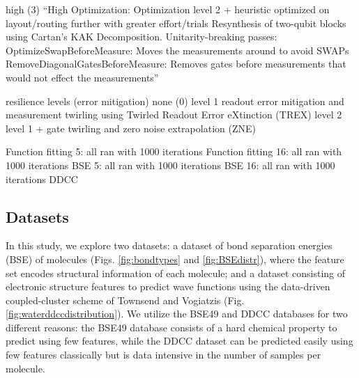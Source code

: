 \documentclass[journal=jacsat,manuscript=article]{achemso}
\begin{document}
high (3)
``High Optimization:
Optimization level 2 + heuristic optimized on layout/routing further with greater effort/trials
Resynthesis of two-qubit blocks using Cartan's KAK Decomposition.
Unitarity-breaking passes:
OptimizeSwapBeforeMeasure: Moves the measurements around to avoid SWAPs
RemoveDiagonalGatesBeforeMeasure: Removes gates before measurements that would not effect the measurements''


resilience levels (error mitigation)
none (0) 
level 1 readout error mitigation and measurement twirling using Twirled Readout Error eXtinction (TREX) \cite{van_den_berg_model-free_2022}
level 2 level 1 + gate twirling and zero noise extrapolation (ZNE)\cite{kandala_error_2019,li_efficient_2017,temme_error_2017}

Function fitting 5: all ran with 1000 iterations
Function fitting 16: all ran with 1000 iterations
BSE 5: all ran with 1000 iterations
BSE 16: all ran with 1000 iterations
DDCC

\subsection{Datasets}\label{subsection:datasets}
In this study, we explore two datasets: a dataset of bond separation energies (BSE) of molecules (Figs. \ref{fig:bondtypes} and \ref{fig:BSEdistr}), where the feature set encodes structural information of each molecule;
and a dataset consisting of electronic structure features to predict wave functions using the data-driven coupled-cluster scheme of Townsend and Vogiatzis (Fig. \ref{fig:waterddccdistribution}).\cite{townsend_data-driven_2019}
We utilize the BSE49 and DDCC databases for two different reasons: the BSE49 database consists of a hard chemical property to predict using few features, while the DDCC dataset can be predicted easily using few features classically but is data intensive in the number of samples per molecule.
\end{document}
